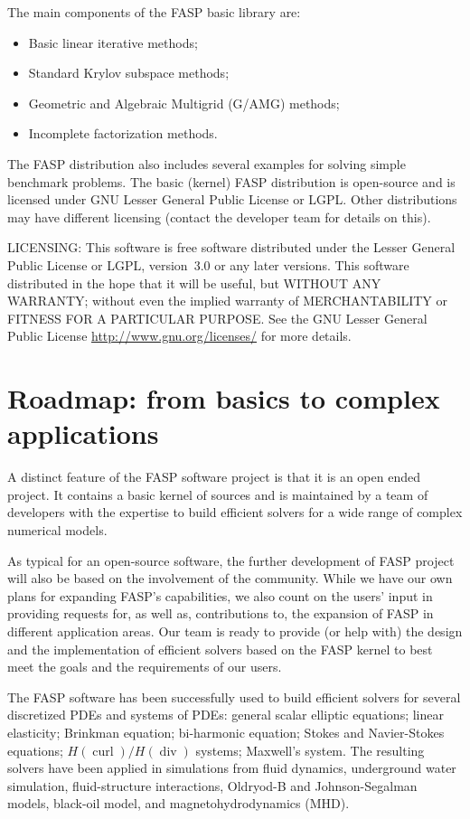 \documentclass[11pt]{memoir}
\begin{document}
The main components of the FASP basic library are:
\begin{itemize}\setlength{\itemsep}{-1mm}
\item Basic linear iterative methods;
\item Standard Krylov subspace methods;
\item Geometric and Algebraic Multigrid (G/AMG) methods;
\item Incomplete factorization methods.
\end{itemize}
The FASP distribution also includes several examples for solving
simple benchmark problems.
%
The basic (kernel) FASP distribution is
open-source and is licensed under GNU Lesser General Public License or
LGPL. Other distributions may have different licensing (contact the
developer team for details on this).
%
\begin{snugshade}\noindent
  LICENSING: This software is free software distributed under the Lesser
  General Public License or LGPL, version~3.0 or any later
  versions. This software distributed in the hope that it will be
  useful, but WITHOUT ANY WARRANTY; without even the implied warranty
  of MERCHANTABILITY or FITNESS FOR A PARTICULAR PURPOSE. See the GNU
  Lesser General Public License \url{http://www.gnu.org/licenses/} for
  more details.
\end{snugshade}

\section{Roadmap: from basics to complex applications} 
A distinct feature of the FASP software project is that it is an open
ended project. It contains a basic kernel of sources and is maintained
by a team of developers with the expertise to build efficient solvers
for a wide range of complex numerical models.

As typical for an open-source software, the further development of
FASP project will also be based on the involvement of the community.
While we have our own plans for expanding FASP's capabilities, we also
count on the users' input in providing requests for, as well as,
contributions to, the expansion of FASP in different application
areas. Our team is ready to provide (or help with) the design and the
implementation of efficient solvers based on the FASP kernel to best
meet the goals and the requirements of our users.

The FASP software has been successfully used to build efficient
solvers for several discretized PDEs and systems of PDEs: general
scalar elliptic equations; linear elasticity; Brinkman equation;
bi-harmonic equation; Stokes and Navier-Stokes equations;
$H(\operatorname{curl})/H(\operatorname{div})$ systems; Maxwell's
system. The resulting solvers have been applied in simulations from
fluid dynamics, underground water simulation, fluid-structure
interactions, Oldryod-B and Johnson-Segalman models, black-oil model,
and magnetohydrodynamics (MHD).
\end{document}
